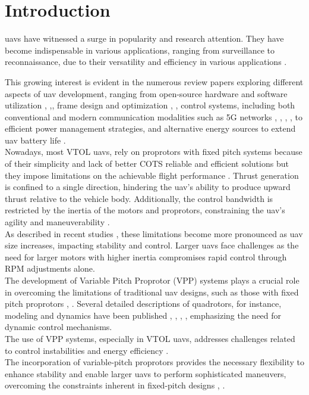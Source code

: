 \chapter{Introduction}
\label{chap:Chapter1}
\glspl{uav} have witnessed a surge in popularity and research attention. 
They have become indispensable in various applications, ranging from surveillance to reconnaissance, due to their versatility and efficiency in various applications \cite{uav1}. 

This growing interest is evident in the numerous review papers exploring different aspects of \gls{uav} development, ranging from open-source hardware and software utilization \cite{uav2}, \cite{uav3},\cite{uav4}, frame design and optimization \cite{uav5}, \cite{uav6}, control systems, including both conventional and modern communication modalities such as 5G networks \cite{uav7}, \cite{uav8}, \cite{uav10}, \cite{uav11}, to efficient power management strategies, and alternative energy sources to extend \gls{uav} battery life \cite{uav15}.\\

Nowadays, most \gls{VTOL} \glspl{uav}, rely on proprotors with fixed pitch systems because of their simplicity and lack of better \gls{COTS} reliable and efficient solutions but they impose limitations on the achievable flight performance \cite{FPP1}.
Thrust generation is confined to a single direction, hindering the \gls{uav}'s ability to produce upward thrust relative to the vehicle body.
Additionally, the control bandwidth is restricted by the inertia of the motors and proprotors, constraining the \gls{uav}'s agility and maneuverability \cite{FPP1}.\\
As described in recent studies \cite{FPP1}, these limitations become more pronounced as \gls{uav} size increases, impacting stability and control. 
Larger \glspl{uav} face challenges as the need for larger motors with higher inertia compromises rapid control through \gls{RPM} adjustments alone.\\

The development of Variable Pitch Proprotor (VPP) systems plays a crucial role in overcoming the limitations of traditional \gls{uav} designs, such as those with fixed pitch proprotors \cite{VPP1}, \cite{FPP1}.
Several detailed descriptions of quadrotors, for instance, modeling and dynamics have been published \cite{FPP2}, \cite{FPP3}, \cite{FPP4}, \cite{FPP5}, emphasizing the need for dynamic control mechanisms.\\
The use of VPP systems, especially in \gls{VTOL} \glspl{uav}, addresses challenges related to control instabilities and energy efficiency \cite{VPP1}.\\
The incorporation of variable-pitch proprotors provides the necessary flexibility to enhance stability and enable larger \glspl{uav} to perform sophisticated maneuvers, overcoming the constraints inherent in fixed-pitch designs \cite{VPP1}, \cite{FPP1}.

